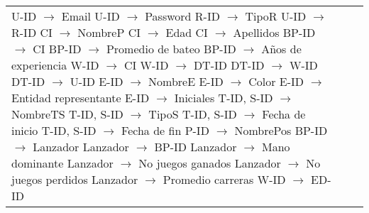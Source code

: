 \documentclass{report}
\begin{document}
\begin{tabularx}{\textwidth}{|X|X|X|}
        U-ID $\rightarrow$ Email \newline 
        U-ID $\rightarrow$ Password \newline 
        R-ID $\rightarrow$ TipoR \newline 
        U-ID $\rightarrow$ R-ID \newline 
        CI $\rightarrow$ NombreP \newline 
        CI $\rightarrow$ Edad \newline 
        CI $\rightarrow$ Apellidos \newline 
        BP-ID $\rightarrow$ CI \newline 
        BP-ID $\rightarrow$ Promedio de bateo \newline 
        BP-ID $\rightarrow$ Años de experiencia \newline 
        W-ID $\rightarrow$ CI \newline 
        W-ID $\rightarrow$ DT-ID \newline 
        DT-ID $\rightarrow$ W-ID \newline 
        DT-ID $\rightarrow$ U-ID \newline 
        E-ID $\rightarrow$ NombreE \newline 
        E-ID $\rightarrow$ Color \newline 
        E-ID $\rightarrow$ Entidad representante \newline 
        E-ID $\rightarrow$ Iniciales \newline 
        T-ID, S-ID $\rightarrow$ NombreTS \newline 
        T-ID, S-ID $\rightarrow$ TipoS \newline 
        T-ID, S-ID $\rightarrow$ Fecha de inicio \newline 
        T-ID, S-ID $\rightarrow$ Fecha de fin \newline 
        P-ID $\rightarrow$ NombrePos \newline 
        BP-ID $\rightarrow$ Lanzador \newline 
        Lanzador $\rightarrow$ BP-ID \newline 
        Lanzador $\rightarrow$ Mano dominante \newline 
        Lanzador $\rightarrow$ No juegos ganados \newline 
        Lanzador $\rightarrow$ No juegos perdidos \newline 
        Lanzador $\rightarrow$ Promedio carreras \newline 
        W-ID $\rightarrow$ ED-ID \newline 

\end{tabularx}
\end{document}
